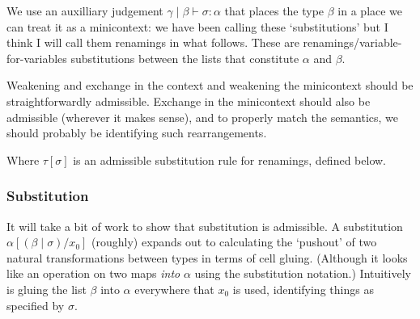 \documentclass[10pt]{article}
\let\emptyset\varnothing
\newcommand{\yields}{\vdash}
\newcommand{\type}{\,\,\mathsf{mtype}}
\begin{document}
We use an auxilliary judgement $\gamma \mid \beta \yields \sigma : \alpha$ that places the type $\beta$ in a place we can treat it as a minicontext: we have been calling these `substitutions' but I think I will call them renamings in what follows. These are renamings/variable-for-variables substitutions between the lists that constitute $\alpha$ and $\beta$.

Weakening and exchange in the context and weakening the minicontext should be straightforwardly admissible. Exchange in the minicontext should also be admissible (wherever it makes sense), and to properly match the semantics, we should probably be identifying such rearrangements.


Where $\tau[\sigma]$ is an admissible substitution rule for renamings, defined below.

\subsubsection{Substitution}

It will take a bit of work to show that substitution is admissible. A substitution $\alpha[(\beta \mid \sigma) / x_0]$ (roughly) expands out to calculating the `pushout' of two natural transformations between types in terms of cell gluing. (Although it looks like an operation on two maps \emph{into} $\alpha$ using the substitution notation.) Intuitively is gluing the list $\beta$ into $\alpha$ everywhere that $x_0$ is used, identifying things as specified by $\sigma$.
\end{document}

